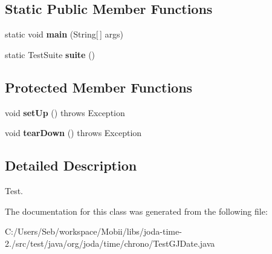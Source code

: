 \subsection*{Static Public Member Functions}
\begin{DoxyCompactItemize}
\item 
\hypertarget{classorg_1_1joda_1_1time_1_1chrono_1_1_test_g_j_date_a71e396c3b357f6901cb5c6c479ceaec5}{static void {\bfseries main} (String\mbox{[}$\,$\mbox{]} args)}\label{classorg_1_1joda_1_1time_1_1chrono_1_1_test_g_j_date_a71e396c3b357f6901cb5c6c479ceaec5}

\item 
\hypertarget{classorg_1_1joda_1_1time_1_1chrono_1_1_test_g_j_date_a5d8ab4b38ec412138b1301d385387c03}{static Test\-Suite {\bfseries suite} ()}\label{classorg_1_1joda_1_1time_1_1chrono_1_1_test_g_j_date_a5d8ab4b38ec412138b1301d385387c03}

\end{DoxyCompactItemize}
\subsection*{Protected Member Functions}
\begin{DoxyCompactItemize}
\item 
\hypertarget{classorg_1_1joda_1_1time_1_1chrono_1_1_test_g_j_date_a094f66c74e2366a0bc934c13ecce2b36}{void {\bfseries set\-Up} ()  throws Exception }\label{classorg_1_1joda_1_1time_1_1chrono_1_1_test_g_j_date_a094f66c74e2366a0bc934c13ecce2b36}

\item 
\hypertarget{classorg_1_1joda_1_1time_1_1chrono_1_1_test_g_j_date_aad1a669378d2d4923e035bed64779088}{void {\bfseries tear\-Down} ()  throws Exception }\label{classorg_1_1joda_1_1time_1_1chrono_1_1_test_g_j_date_aad1a669378d2d4923e035bed64779088}

\end{DoxyCompactItemize}


\subsection{Detailed Description}
Test. 

The documentation for this class was generated from the following file\-:\begin{DoxyCompactItemize}
\item 
C\-:/\-Users/\-Seb/workspace/\-Mobii/libs/joda-\/time-\/2./src/test/java/org/joda/time/chrono/Test\-G\-J\-Date.\-java\end{DoxyCompactItemize}
